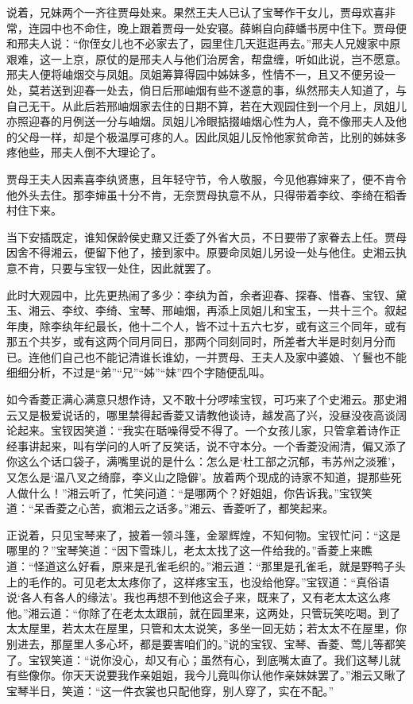 \documentclass[12pt,oneside]{book}
\begin{document}
说着，兄妹两个一齐往贾母处来。果然王夫人已认了宝琴作干女儿，贾母欢喜非常，连园中也不命住，晚上跟着贾母一处安寝。薛蝌自向薛蟠书房中住下。贾母便和邢夫人说：“你侄女儿也不必家去了，园里住几天逛逛再去。”邢夫人兄嫂家中原艰难，这一上京，原仗的是邢夫人与他们治房舍，帮盘缠，听如此说，岂不愿意。邢夫人便将岫烟交与凤姐。凤姐筹算得园中姊妹多，性情不一，且又不便另设一处，莫若送到迎春一处去，倘日后邢岫烟有些不遂意的事，纵然邢夫人知道了，与自己无干。从此后若邢岫烟家去住的日期不算，若在大观园住到一个月上，凤姐儿亦照迎春的月例送一分与岫烟。凤姐儿冷眼掂掇岫烟心性为人，竟不像邢夫人及他的父母一样，却是个极温厚可疼的人。因此凤姐儿反怜他家贫命苦，比别的姊妹多疼他些，邢夫人倒不大理论了。

贾母王夫人因素喜李纨贤惠，且年轻守节，令人敬服，今见他寡婶来了，便不肯令他外头去住。那李婶虽十分不肯，无奈贾母执意不从，只得带着李纹、李绮在稻香村住下来。

当下安插既定，谁知保龄侯史鼐又迁委了外省大员，不日要带了家眷去上任。贾母因舍不得湘云，便留下他了，接到家中。原要命凤姐儿另设一处与他住。史湘云执意不肯，只要与宝钗一处住，因此就罢了。

此时大观园中，比先更热闹了多少：李纨为首，余者迎春、探春、惜春、宝钗、黛玉、湘云、李纹、李绮、宝琴、邢岫烟，再添上凤姐儿和宝玉，一共十三个。叙起年庚，除李纨年纪最长，他十二个人，皆不过十五六七岁，或有这三个同年，或有那五个共岁，或有这两个同月同日，那两个同刻同时，所差者大半是时刻月分而已。连他们自己也不能记清谁长谁幼，一并贾母、王夫人及家中婆娘、丫鬟也不能细细分析，不过是“弟”“兄”“姊”“妹”四个字随便乱叫。

如今香菱正满心满意只想作诗，又不敢十分啰嗦宝钗，可巧来了个史湘云。那史湘云又是极爱说话的，哪里禁得起香菱又请教他谈诗，越发高了兴，没昼没夜高谈阔论起来。宝钗因笑道：“我实在聒噪得受不得了。一个女孩儿家，只管拿着诗作正经事讲起来，叫有学问的人听了反笑话，说不守本分。一个香菱没闹清，偏又添了你这么个话口袋子，满嘴里说的是什么：怎么是‘杜工部之沉郁，韦苏州之淡雅’，又怎么是‘温八叉之绮靡，李义山之隐僻’。放着两个现成的诗家不知道，提那些死人做什么！”湘云听了，忙笑问道：“是哪两个？好姐姐，你告诉我。”宝钗笑道：“呆香菱之心苦，疯湘云之话多。”湘云、香菱听了，都笑起来。

正说着，只见宝琴来了，披着一领斗篷，金翠辉煌，不知何物。宝钗忙问：“这是哪里的？”宝琴笑道：“因下雪珠儿，老太太找了这一件给我的。”香菱上来瞧道：“怪道这么好看，原来是孔雀毛织的。”湘云道：“那里是孔雀毛，就是野鸭子头上的毛作的。可见老太太疼你了，这样疼宝玉，也没给他穿。”宝钗道：“真俗语说‘各人有各人的缘法’。我也再想不到他这会子来，既来了，又有老太太这么疼他。”湘云道：“你除了在老太太跟前，就在园里来，这两处，只管玩笑吃喝。到了太太屋里，若太太在屋里，只管和太太说笑，多坐一回无妨；若太太不在屋里，你别进去，那屋里人多心坏，都是要害咱们的。”说的宝钗、宝琴、香菱、莺儿等都笑了。宝钗笑道：“说你没心，却又有心；虽然有心，到底嘴太直了。我们这琴儿就有些像你。你天天说要我作亲姐姐，我今儿竟叫你认他作亲妹妹罢了。”湘云又瞅了宝琴半日，笑道：“这一件衣裳也只配他穿，别人穿了，实在不配。”
\end{document}
